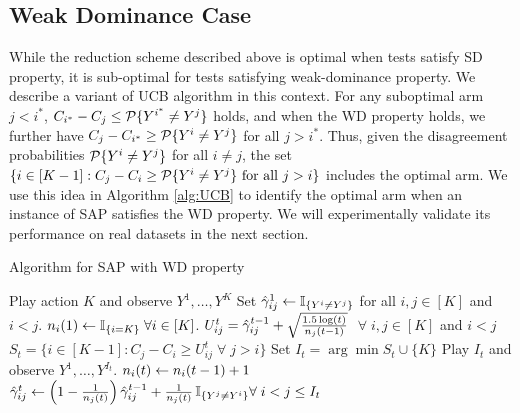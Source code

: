 \subsection{Weak Dominance Case}
While the reduction scheme described above is optimal  when tests satisfy SD property, it is sub-optimal for tests satisfying weak-dominance property. We describe a variant of UCB algorithm in this context. For any suboptimal arm $j < i^*$,  $C_{i^*}-C_j \leq \P\{Y^{i^*} \neq Y^j\}$ holds, and when the WD property holds, we further have $C_j -C_{i^*} \geq \P\{Y^i \neq Y^j\}$ for all $j>i^*$. Thus, given the disagreement probabilities $\P\{Y^i \neq Y^j\}$ for all $i \neq j$, the set $\{i \in [K-1]: C_j - C_i \geq \P\{Y^i \neq Y^j\} \mbox{ for all } j>i\}$ includes the optimal arm. We use this idea in Algorithm \ref{alg:UCB} to identify the optimal arm when an instance of SAP satisfies the WD property. We will experimentally validate its performance  on real datasets in the next section.
\begin{minipage}{0.48\textwidth}
		\begin{algorithm}[H]
			\caption{Algorithm for SAP with WD property} %
			\label{alg:UCB}
			\begin{algorithmic}[1]
				\STATE Play action $K$ and observe $Y^1,\dots,Y^K$
				\STATE Set $\hgamma_{ij}^1 \set \one{Y^i\ne Y^j}$ for all $i,j\in [K]$ and $i < j$.
				\STATE $n_i(1)\leftarrow \one{i=K} \; \forall i\in [K]$.
				\STATE $U_{ij}^t=\hgamma_{ij}^{t-1} + \sqrt{\frac{1.5\log(t)}{n_j(t-1)}}$  $\;\forall \; i,j \in [K]$ and $i<j$ \label{algo:UCB}
				\STATE $S_t=\{i \in [K-1]: C_j-C_i \geq U_{ij}^t \;\forall \;   j > i \}$ \label{algo:sort}
				\STATE Set $I_t= \arg \min S_t \cup \{K\} $
				\STATE Play $I_t$ and observe $Y^1,\dots,Y^{I_t}$.
				\STATE $n_i(t) \set n_i(t-1)+1$\\
				 \STATE $\hgamma_{ij}^t \set \left (1-\frac{1}{n_j(t)}\right )
				 \hgamma_{ij}^{t-1} + \frac{1}{n_j(t)} \,\one{Y^j\ne Y^i} \forall \; i<j \leq I_t$ \label{algo:Update}
				\ENDFOR
				\ENDFOR
			\end{algorithmic}
		\end{algorithm}
	\end{minipage}
	
